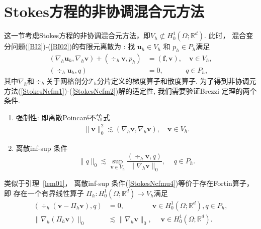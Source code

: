 \section{Stokes方程的非协调混合元方法}

这一节考虑Stokes方程的非协调混合元方法，即$V_h \not\subset H_0^{1}(\Omega; \mathbb{R}^{d})$. 此时，
混合变分问题(\ref{BI2})-(\ref{BI02})的有限元离散为 : 找 $\boldsymbol{u}_h \in  V_h$ 和 $p_h \in P_h$满足
\begin{align}
(\nabla_h\boldsymbol{u}_h,\nabla_h\boldsymbol{v}) + (\div_h\boldsymbol{v},p_h) &=(\boldsymbol{f},\boldsymbol{v}),\quad \boldsymbol{v}\in   V_h,\label{StokesNcfm1}\\
(\div_h\boldsymbol{u}_h,q) &=0, \quad\quad\quad\, q\in P_h,\label{StokesNcfm2}
\end{align}
其中$\nabla_h$和$\div_h$关于网格剖分$\mathcal T_h$分片定义的梯度算子和散度算子.
为了得到非协调元方法(\ref{StokesNcfm1})-(\ref{StokesNcfm2})解的适定性, 我们需要验证Brezzi 定理的两个条件.
\begin{enumerate}[label=(\alph*)]
\item 强制性: 即离散Poincar\'e不等式
\begin{align}\label{StokesNcfmu3}
\|\boldsymbol{v}\|^{2}_{0}
\lesssim (\nabla_h\boldsymbol{v},\nabla_h\boldsymbol{v}),\quad \boldsymbol{v}\in  V_h.\end{align}
\item 离散inf-sup 条件
\begin{equation}\label{StokesNcfmu4}
\|q\|_{0}\lesssim\sup _{\boldsymbol{v} \in  V_h}
\frac{(\div_h\boldsymbol{v}, q)}{\|\nabla_h\boldsymbol{v}\|_{0}},\quad\, q\in P_h.
\end{equation}
\end{enumerate}

类似于引理~\ref{lem01}，
离散inf-sup 条件(\ref{StokesNcfmu4})等价于存在Fortin算子，即
存在一个有界线性算子 $\Pi_h :H_0^{1}(\Omega; \mathbb{R}^{d})\rightarrow V_h$满足
\begin{align}
 (\div_h(\boldsymbol{v}-\Pi_h\boldsymbol{v}), q) &=0,\qquad\qquad  \boldsymbol{v}\in H_0^{1}(\Omega; \mathbb{R}^{d}),q\in P_{h} ,\label{ncfmk1}\\
 \|\nabla_h(\Pi_h\boldsymbol{v})\|_{0} &\lesssim\|\nabla_h\boldsymbol{v}\|_{0}, \quad\;  \boldsymbol{v}\in H_0^{1}(\Omega; \mathbb{R}^{d}).\label{ncfmk2}
\end{align}

